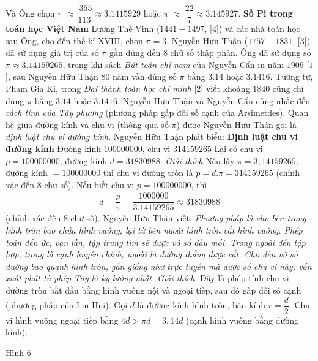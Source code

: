 \begin{multicols}{2}
	Và Ông chọn $\pi \; \approx \dfrac{{\;355}}{{113}} \approx 3.1415929$
	hoặc  $\pi \; \approx \;\dfrac{{22}}{7} \approx 3.145927$. 
	\vskip 0.1cm
	\textbf{\color{lichsutoanhoc}Số Pi trong toán học Việt Nam}
	\vskip 0.1cm
	Lương Thế Vinh ($1441-1497$, [$4$]) và các nhà toán học sau Ông, cho đến thế kỉ XVIII, chọn $\pi = 3$.  Nguyễn Hữu Thận ($1757-1831$, [$3$]) đã sử dụng giá trị của số $\pi$ gần đúng đến $8$ chữ số thập phân. Ông đã sử dụng số $\pi  \approx 3.14159265$,  trong khi sách \textit{Bút toán chỉ nam} của Nguyễn Cẩn in năm $1909$ [$1$], sau Nguyễn Hữu Thận $80$ năm vẫn dùng số  $\pi$  bằng $3.14$ hoặc $3.1416$. Tương tự, Phạm Gia Kỉ, trong \textit{Đại thành toán học chỉ minh} [$2$] viết khoảng $1840$ cũng chỉ dùng $\pi$  bằng $3.14$ hoặc $3.1416$.  Nguyễn Hữu Thận và Nguyễn Cẩn cũng nhắc đến \textit{cách tính của Tây phương} (phương pháp gấp đôi số cạnh của Arsimetdes). Quan hệ giữa đường kính và chu vi (thông qua số  $\pi$) được Nguyễn Hữu Thận gọi là \textit{định luật chu vi đường kính}. Nguyễn Hữu Thận phát biểu:
	\vskip 0.1cm
	\textbf{\color{lichsutoanhoc}Định luật chu vi đường kính}
	\vskip 0.1cm
	Đường kính $100000000$, chu vi $314159265$
	\vskip 0.1cm
	Lại có chu vi $p = 100000000$, đường kính $d = 31830988$.
	\vskip 0.1cm
	\textit{Giải thích} Nếu lấy $\pi = 3,14159265$, đường kính $= 100000000$ thì chu vi đường tròn là  $p = d.\pi = 314159265$ (chính xác đến $8$ chữ số).
	\vskip 0.1cm
	Nếu biết chu vi $p = 100000000$,  thì 
	\begin{align*}
		d = \dfrac{p}{\pi } = \dfrac{{1000000}}{{3.14159265}} \approx 31830988
	\end{align*}
	(chính xác đến $8$ chữ số).
	\vskip 0.1cm
	Nguyễn Hữu Thận viết: \textit{Phương pháp là cho bên trong hình tròn bao chứa hình vuông, lại từ bên ngoài hình tròn cắt hình vuông. Phép toán đến ức, vạn lần, tập trung tìm sẽ được vô số đầu mối. Trong ngoài đến tập hợp, trong là cạnh huyền chính, ngoài là đường thẳng được cắt. Cho đến vô số đường bao quanh hình tròn, gần giống như trực tuyến mà được số chu vi này, vốn xuất phát từ phép Tây là kỹ lưỡng nhất.}
	\vskip 0.1cm
	\textit{Giải thích}. Đây là phép tính chu vi đường tròn bắt đầu bằng hình vuông nội và ngoại tiếp, sau đó gấp đôi số cạnh (phương pháp của Liu Hui). 
	Gọi $d$ là đường kính hình tròn, bán kính $r = \dfrac{d}{2}$. Chu vi hình vuông ngoại tiếp bằng $4d > \pi d = 3,14d$
	(cạnh hình vuông bằng đường kính). 	
	
	Hình $6$
	

\end{multicols}
